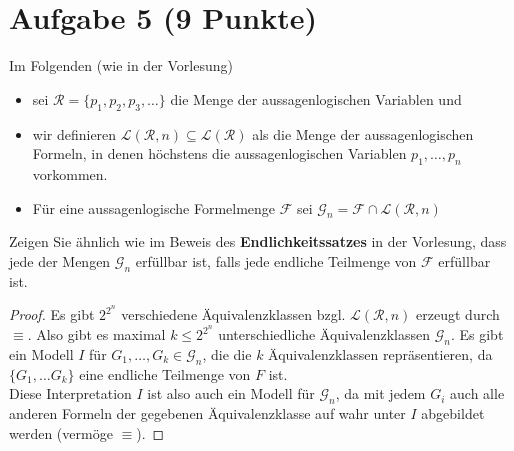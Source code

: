 \documentclass[12pt,a4paper]{article}
\renewcommand{\L}{\mathcal{L}} %
\newcommand{\RR}{\mathcal{R}} %
\newcommand{\F}{\mathcal{F}}
\newcommand{\G}{\mathcal{G}}
\begin{document}
\section*{Aufgabe 5 (9 Punkte)}
Im Folgenden (wie in der Vorlesung)
\begin{itemize}
\item sei $\RR=\big\lbrace p_1,p_2,p_3,\ldots\big\rbrace$ die Menge der aussagenlogischen Variablen und
\item wir definieren $\L(\RR,n)\subseteq\L(\RR)$ als die Menge der aussagenlogischen Formeln, in denen höchstens die aussagenlogischen Variablen $p_1,\ldots,p_n$ vorkommen.
\item Für eine aussagenlogische Formelmenge $\F$ sei $\G_n=\F\cap\L(\RR,n)$
\end{itemize}
Zeigen Sie ähnlich wie im Beweis des \textbf{Endlichkeitssatzes} in der Vorlesung, dass jede der Mengen $\G_n$ erfüllbar ist, falls jede endliche Teilmenge von $\F$ erfüllbar ist.

\begin{proof}

Es gibt $2^{2^n}$ verschiedene Äquivalenzklassen bzgl. $\L(\RR,n)$ erzeugt durch $\equiv$. Also gibt es maximal $k\leq2^{2^n}$ unterschiedliche Äquivalenzklassen $\G_n$.
Es gibt ein Modell $I$ für $G_1,\ldots,G_k\in\G_n$, die die $k$ Äquivalenzklassen repräsentieren, da $\lbrace G_1,\ldots G_k\rbrace$ eine endliche Teilmenge von $F$ ist.\\
Diese Interpretation $I$ ist also auch ein Modell für $\G_n$, da mit jedem $G_i$ auch alle anderen Formeln der gegebenen Äquivalenzklasse auf wahr unter $I$ abgebildet werden (vermöge $\equiv$).
\end{proof}
\end{document}

